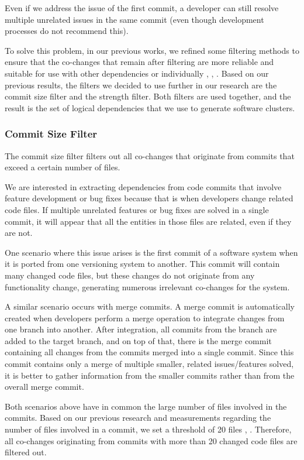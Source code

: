 Even if we address the issue of the first commit, a developer can still resolve multiple unrelated issues in the same commit (even though development processes do not recommend this).

To solve this problem, in our previous works, we refined some filtering methods to ensure that the co-changes that remain after filtering are more reliable and suitable for use with other dependencies or individually \cite{b4}, \cite{b5}, \cite{b6}. Based on our previous results, the filters we decided to use further in our research are the commit size filter and the strength filter. Both filters are used together, and the result is the set of logical dependencies that we use to generate software clusters.

\subsubsection{Commit Size Filter}

The commit size filter filters out all co-changes that originate from commits that exceed a certain number of files.

We are interested in extracting dependencies from code commits that involve feature development or bug fixes because that is when developers change related code files. If multiple unrelated features or bug fixes are solved in a single commit, it will appear that all the entities in those files are related, even if they are not.

One scenario where this issue arises is the first commit of a software system when it is ported from one versioning system to another. This commit will contain many changed code files, but these changes do not originate from any functionality change, generating numerous irrelevant co-changes for the system.

A similar scenario occurs with merge commits. A merge commit is automatically created when developers perform a merge operation to integrate changes from one branch into another. After integration, all commits from the branch are added to the target branch, and on top of that, there is the merge commit containing all changes from the commits merged into a single commit. Since this commit contains only a merge of multiple smaller, related issues/features solved, it is better to gather information from the smaller commits rather than from the overall merge commit.

Both scenarios above have in common the large number of files involved in the commits. Based on our previous research and measurements regarding the number of files involved in a commit, we set a threshold of 20 files \cite{b4}, \cite{b5}. Therefore, all co-changes originating from commits with more than 20 changed code files are filtered out.



